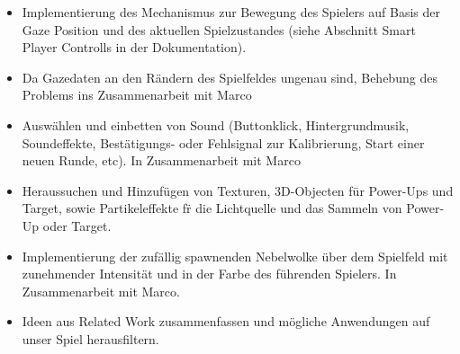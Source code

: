 \documentclass[10pt,a4paper]{article}
\begin{document}
\begin{itemize}
			\item Implementierung des Mechanismus zur Bewegung des Spielers auf Basis der Gaze Position und des aktuellen Spielzustandes (siehe Abschnitt Smart Player Controlls in der Dokumentation).
			\item Da Gazedaten an den R\"andern des Spielfeldes ungenau sind, Behebung des Problems ins Zusammenarbeit mit Marco
\item Ausw\"ahlen und einbetten von Sound (Buttonklick, Hintergrundmusik, Soundeffekte, Best\"atigungs- oder Fehlsignal zur Kalibrierung, Start einer neuen Runde, etc). In Zusammenarbeit mit Marco
			\item Heraussuchen und Hinzuf\"ugen von Texturen, 3D-Objecten f\"ur Power-Ups und Target, sowie Partikeleffekte f\"r die Lichtquelle und das Sammeln von Power-Up oder Target.
			\item Implementierung der zuf\"allig spawnenden Nebelwolke \"uber dem Spielfeld mit zunehmender Intensit\"at und in der Farbe des f\"uhrenden Spielers. In Zusammenarbeit mit Marco.
			\item Ideen aus Related Work zusammenfassen und m\"ogliche Anwendungen auf unser Spiel herausfiltern.
		\end{itemize}
\end{document}
